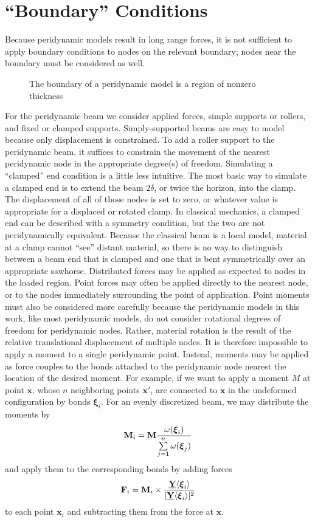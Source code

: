 \section{``Boundary'' Conditions}
Because peridynamic models result in long range forces, it is not sufficient to apply boundary conditions to nodes on the relevant boundary; nodes near the boundary must be considered as well.
%
\begin{figure}[tbp]
  \centering
  
  \caption{The boundary of a peridynamic model is a region of nonzero thickness}
  \label{fig:PDboundary}
\end{figure}
%
For the peridynamic beam we consider applied forces, simple supports or rollers, and fixed or clamped supports.
Simply-supported beams are easy to model because only displacement is constrained.
To add a roller support to the peridynamic beam, it suffices to constrain the movement of the nearest peridynamic node in the appropriate degree(s) of freedom.
Simulating a ``clamped'' end condition is a little less intuitive. 
The most basic way to simulate a clamped end is to extend the beam \(2\delta\), or twice the horizon, into the clamp. The displacement of all of those nodes is set to zero, or whatever value is appropriate for a displaced or rotated clamp.
In classical mechanics, a clamped end can be described with a symmetry condition, but the two are not peridynamically equivalent.
Because the classical beam is a local model, material at a clamp cannot ``see'' distant material, so there is no way to distinguish between a beam end that is clamped and one that is bent symmetrically over an appropriate sawhorse.
Distributed forces may be applied as expected to nodes in the loaded region.
Point forces may often be applied directly to the nearest node, or to the nodes immediately surrounding the point of application.
Point moments must also be considered more carefully because the peridynamic models in this work, like most peridynamic models, do not consider rotational degrees of freedom for peridynamic nodes.
Rather, material rotation is the result of the relative translational displacement of multiple nodes.
It is therefore impossible to apply a moment to a single peridynamic point.
Instead, moments may be applied as force couples to the bonds attached to the peridynamic node nearest the location of the desired moment.
For example, if we want to apply a moment $M$ at point $\mathbf{x}$, whose $n$ neighboring points $\mathbf{x}'_i$ are connected to $\mathbf{x}$ in the undeformed configuration by bonds $\boldsymbol{\xi}_i$.
For an evenly discretized beam, we may distribute the moments by
\begin{equation}
\mathbf{M}_i = \mathbf{M} \frac{\omega(\boldsymbol{\xi}_i)}{\sum\limits_{j=1}^n \omega(\boldsymbol{\xi}_j)}\notag
\end{equation}
and apply them to the corresponding bonds by adding forces
\begin{equation}
\mathbf{F}_i = \mathbf{M}_i \times \frac{\vstate{Y}{}{\boldsymbol{\xi}_i}}{|\vstate{Y}{}{\boldsymbol{\xi}_i}|^2}\notag
\end{equation}
to each point $\mathbf{x}_i$ and subtracting them from the force at $\mathbf{x}$.

